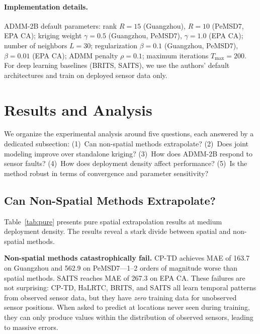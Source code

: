 \documentclass[journal]{IEEEtran}
\begin{document}
\paragraph{Implementation details.}
ADMM-2B default parameters: rank $R = 15$ (Guangzhou), $R = 10$ (PeMSD7, EPA CA); kriging weight $\gamma = 0.5$ (Guangzhou, PeMSD7), $\gamma = 1.0$ (EPA CA); number of neighbors $L = 30$; regularization $\beta = 0.1$ (Guangzhou, PeMSD7), $\beta = 0.01$ (EPA CA); ADMM penalty $\rho = 0.1$; maximum iterations $T_{\max} = 200$. For deep learning baselines (BRITS, SAITS), we use the authors' default architectures and train on deployed sensor data only.

\section{Results and Analysis}\label{sec:results}

We organize the experimental analysis around five questions, each answered by a dedicated subsection: (1)~Can non-spatial methods extrapolate? (2)~Does joint modeling improve over standalone kriging? (3)~How does ADMM-2B respond to sensor faults? (4)~How does deployment density affect performance? (5)~Is the method robust in terms of convergence and parameter sensitivity?

\subsection{Can Non-Spatial Methods Extrapolate?}\label{sec:results_q1}

Table~\ref{tab:pure} presents pure spatial extrapolation results at medium deployment density. The results reveal a stark divide between spatial and non-spatial methods.

\textbf{Non-spatial methods catastrophically fail.}
CP-TD achieves MAE of 163.7 on Guangzhou and 562.9 on PeMSD7---1--2 orders of magnitude worse than spatial methods. SAITS reaches MAE of 267.3 on EPA CA. These failures are not surprising: CP-TD, HaLRTC, BRITS, and SAITS all learn temporal patterns from observed sensor data, but they have \emph{zero} training data for unobserved sensor positions. When asked to predict at locations never seen during training, they can only produce values within the distribution of observed sensors, leading to massive errors.
\end{document}
